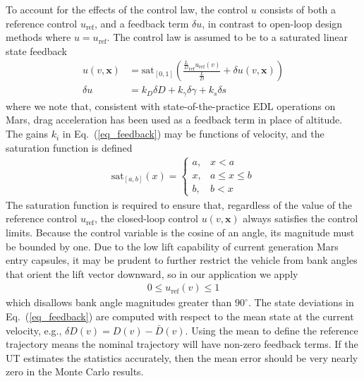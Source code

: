 \documentclass[journal ]{new-aiaa}
\newcommand{\state}{\ensuremath{\mathbf{x}}}
\newcommand{\ur}{\ensuremath{u_{\mathrm{ref}}}}
\begin{document}
To account for the effects of the control law, the control $u$ consists of both a reference control $\ur$, and a feedback term $\delta u$, in contrast to open-loop design methods where $u=\ur$. 
The control law is assumed to be to a saturated linear state feedback 
\begin{align}
u(v,\state) &= \mathrm{sat}_{[0,1]}\left(\frac{\frac{L}{D}_{\mathrm{ref}}\ur(v)}{\frac{L}{D}} + \delta u(v,\state)\right) \label{eq_control}\\
\delta u &= k_D\delta D + k_{\gamma}\delta\gamma + k_s\delta s \label{eq_feedback}
\end{align}
where we note that, consistent with state-of-the-practice EDL operations on Mars, drag acceleration has been used as a feedback term in place of altitude. 
The gains $k_i$ in Eq.~(\ref{eq_feedback}) may be functions of velocity, and the saturation function is defined
\begin{align*}
\mathrm{sat}_{[a,b]}(x) = \left\{\begin{array}{lc}
        a, &  x < a\\
        x, &  a\le x \le b\\
        b, &  b < x
        \end{array} \right. %
\end{align*}
The saturation function is required to ensure that, regardless of the value of the reference control \ur, the closed-loop control $u(v,\state)$ always satisfies the control limits. Because the control variable is the cosine of an angle, its magnitude must be bounded by one. Due to the low lift capability of current generation Mars entry capsules, it may be prudent to further restrict the vehicle from bank angles that orient the lift vector downward, so in our application we apply
\begin{align}
	0 \le \ur(v) \le 1 \label{eq_control_bounds}
\end{align}
which disallows bank angle magnitudes greater than $90^\circ$.
The state deviations in Eq.~(\ref{eq_feedback}) are computed with respect to the mean state at the current velocity, e.g., $\delta D(v) = D(v) - \bar{D}(v)$.
Using the mean to define the reference trajectory means the nominal trajectory will have non-zero feedback terms. If the UT estimates the statistics accurately, then the mean error should be very nearly zero in the Monte Carlo results. 
\end{document}
